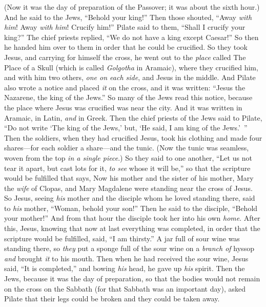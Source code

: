 \begin{biblechapter}
\verse (Now it was the day of preparation of the Passover; it was about the sixth hour.) And he said to the Jews, “Behold your king!”
\verse Then those shouted, “Away \textit{with him}! Away \textit{with him}! Crucify him!” Pilate said to them, “Shall I crucify your king?” The chief priests replied, “We do not have a king except Caesar!”
\verse So then he handed him over to them in order that he could be crucified.
 So they took Jesus,
\verse and carrying for himself the cross, he went out to the \textit{place} called The Place of a Skull (which is called \textit{Golgotha} in Aramaic),
\verse where they crucified him, and with him two others, \textit{one on each side}, and Jesus in the middle.
\verse And Pilate also wrote a notice and placed \textit{it} on the cross, and it was written: “Jesus the Nazarene, the king of the Jews.”
\verse So many of the Jews read this notice, because the place where Jesus was crucified was near the city. And it was written in Aramaic, in Latin, \textit{and} in Greek.
\verse Then the chief priests of the Jews said to Pilate, “Do not write ‘The king of the Jews,’ but, ‘He said, I am king of the Jews.’ ”
\verse Then the soldiers, when they had crucified Jesus, took his clothing and made four shares—for each soldier a share—and the tunic. (Now the tunic was seamless, woven from the top \textit{in a single piece}.)
\verse So they said to one another, “Let us not tear it apart, but cast lots for it, \textit{to see} whose it will be,” so that the scripture would be fulfilled that says,
\verse Now his mother and the sister of his mother, Mary the \textit{wife} of Clopas, and Mary Magdalene were standing near the cross of Jesus.
\verse So Jesus, seeing \textit{his} mother and the disciple whom he loved standing there, said to \textit{his} mother, “Woman, behold your son!”
\verse Then he said to the disciple, “Behold your mother!” And from that hour the disciple took her into his own \textit{home}.
 After this, Jesus, knowing that now at last everything was completed, in order that the scripture would be fulfilled, said, “I am thirsty.”
\verse A jar full of sour wine was standing there, so \textit{they} put a sponge full of the sour wine on a \textit{branch of} hyssop \textit{and} brought \textit{it} to his mouth.
\verse Then when he had received the sour wine, Jesus said, “It is completed,” and bowing \textit{his} head, he gave up \textit{his} spirit.
\verse Then the Jews, because it was the day of preparation, so that the bodies would not remain on the cross on the Sabbath (for that Sabbath was an important day), asked Pilate that their legs could be broken and they could be taken away.

\end{biblechapter}
